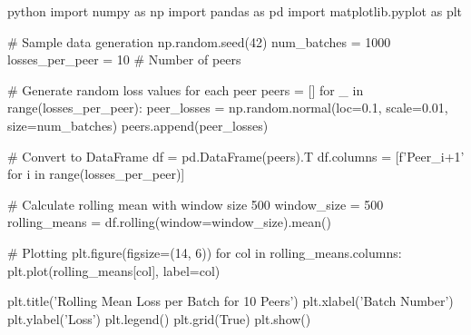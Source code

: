 python
import numpy as np
import pandas as pd
import matplotlib.pyplot as plt

# Sample data generation
np.random.seed(42)
num_batches = 1000
losses_per_peer = 10  # Number of peers

# Generate random loss values for each peer
peers = []
for _ in range(losses_per_peer):
    peer_losses = np.random.normal(loc=0.1, scale=0.01, size=num_batches)
    peers.append(peer_losses)

# Convert to DataFrame
df = pd.DataFrame(peers).T
df.columns = [f'Peer_{i+1}' for i in range(losses_per_peer)]

# Calculate rolling mean with window size 500
window_size = 500
rolling_means = df.rolling(window=window_size).mean()

# Plotting
plt.figure(figsize=(14, 6))
for col in rolling_means.columns:
    plt.plot(rolling_means[col], label=col)

plt.title('Rolling Mean Loss per Batch for 10 Peers')
plt.xlabel('Batch Number')
plt.ylabel('Loss')
plt.legend()
plt.grid(True)
plt.show()